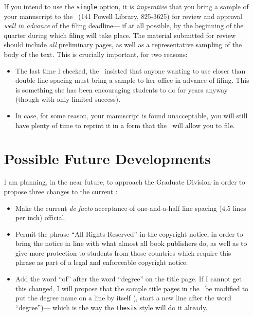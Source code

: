 If you intend to use the \verb+single+ option,
it is {\em imperative\/} that you bring a sample of your manuscript
to the \tdadvisor\ (141 Powell Library, 825-3625)
for review and approval
{\em well in advance\/} of the filing deadline---%
if at all possible, by the beginning of the quarter
during which filing will take place.
The material submitted for review
should include {\em all\/} preliminary pages,
as well as a representative sampling of the body of the text.
This is crucially important, for two reasons:

\begin {itemize}

\item
The last time I checked, the \tdadvisor\ insisted that anyone
wanting to use closer than double line spacing must bring a sample
to her office in advance of filing.
This is something she has been encouraging students to do for
years anyway (though with only limited success).

\item
In case, for some reason, your manuscript is found unacceptable,
you will still have plenty of time to reprint it in a form that
the \tdadvisor\ will allow you to file.

\end {itemize}

\section {Possible Future Developments}

I am planning, in the near future, to approach the Graduate Division
in order to propose three changes to the current \regs:

\begin {itemize}

\item
Make the current {\em de facto\/} acceptance
of one-and-a-half line spacing (4.5 lines per inch) official.

\item
Permit the phrase ``All Rights Reserved'' in the copyright notice,
in order to bring the notice in line with what almost all book
publishers do, as well as to give more protection to students from
those countries which require this phrase as part of a legal and
enforceable copyright notice.

\item
Add the word ``of'' after the word ``degree'' on the title page.
If I cannot get this changed, I will propose that the sample title
pages in the \regs\ be modified to put the degree name on a line
by itself (\ie, start a new line after the word ``degree'')---%
which is the way the \verb+thesis+ style will do it already.

\end {itemize}

